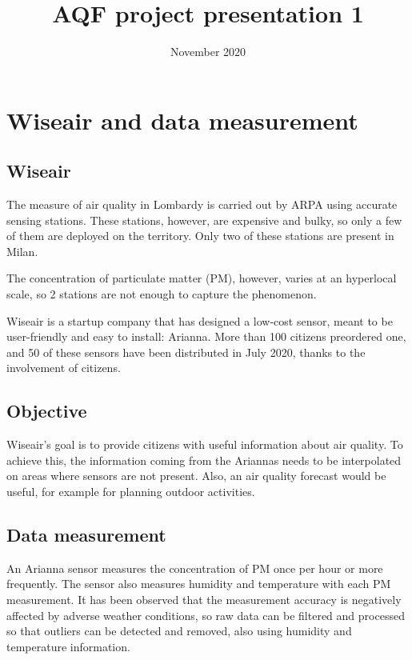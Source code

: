 \documentclass{article}
\title{AQF project presentation 1}
\date{November 2020}
\begin{document}
\maketitle

\section{Wiseair and data measurement}

\subsection{Wiseair}

The measure of air quality in Lombardy is carried out by ARPA using accurate sensing stations. These stations, however, are expensive and bulky, so only a few of them are deployed on the territory. Only two of these stations are present in Milan. 

The concentration of particulate matter (PM), however, varies at an hyperlocal scale, so 2 stations are not enough to capture the phenomenon. 

Wiseair is a startup company that has designed a low-cost sensor, meant to be user-friendly and easy to install: Arianna. More than 100 citizens preordered one, and 50 of these sensors have been distributed in July 2020, thanks to the involvement of citizens.

\subsection{Objective}

Wiseair's goal is to provide citizens with useful information about air quality. To achieve this, the information coming from the Ariannas needs to be interpolated on areas where sensors are not present. Also, an air quality forecast would be useful, for example for planning outdoor activities. 

\subsection{Data measurement}

An Arianna sensor measures the concentration of PM once per hour or more frequently. The sensor also measures humidity and temperature with each PM measurement. It has been observed that the measurement accuracy is negatively affected by adverse weather conditions, so raw data can be filtered and processed so that outliers can be detected and removed, also using humidity and temperature information.
\end{document}
